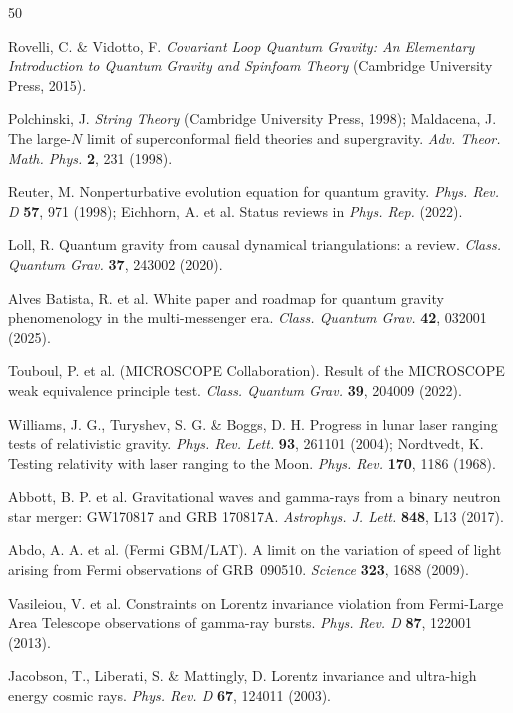 \documentclass[11pt,a4paper]{article}
\begin{document}
\begin{thebibliography}{50}\small

 Rovelli, C. \& Vidotto, F. \emph{Covariant Loop Quantum Gravity: An
Elementary Introduction to Quantum Gravity and Spinfoam Theory} (Cambridge University Press,
2015).

 Polchinski, J. \emph{String Theory} (Cambridge University Press, 1998);
Maldacena, J. The large-$N$ limit of superconformal field theories and supergravity.
\emph{Adv. Theor. Math. Phys.} \textbf{2}, 231 (1998).

 Reuter, M. Nonperturbative evolution equation for quantum gravity.
\emph{Phys. Rev. D} \textbf{57}, 971 (1998); Eichhorn, A. et al. Status reviews in
\emph{Phys. Rep.} (2022).

 Loll, R. Quantum gravity from causal dynamical triangulations: a review.
\emph{Class. Quantum Grav.} \textbf{37}, 243002 (2020).

 Alves Batista, R. et al. White paper and roadmap for quantum gravity
phenomenology in the multi-messenger era. \emph{Class. Quantum Grav.} \textbf{42}, 032001 (2025).

 Touboul, P. et al. (MICROSCOPE Collaboration). Result of the MICROSCOPE
weak equivalence principle test. \emph{Class. Quantum Grav.} \textbf{39}, 204009 (2022).

 Williams, J. G., Turyshev, S. G. \& Boggs, D. H. Progress in lunar laser
ranging tests of relativistic gravity. \emph{Phys. Rev. Lett.} \textbf{93}, 261101 (2004);
Nordtvedt, K. Testing relativity with laser ranging to the Moon. \emph{Phys. Rev.}
\textbf{170}, 1186 (1968).

 Abbott, B. P. et al. Gravitational waves and gamma-rays from a binary neutron
star merger: GW170817 and GRB 170817A. \emph{Astrophys. J. Lett.} \textbf{848}, L13 (2017).

 Abdo, A. A. et al. (Fermi GBM/LAT). A limit on the variation of speed of
light arising from Fermi observations of GRB~090510. \emph{Science} \textbf{323}, 1688 (2009).

 Vasileiou, V. et al. Constraints on Lorentz invariance violation from
Fermi-Large Area Telescope observations of gamma-ray bursts. \emph{Phys. Rev. D} \textbf{87},
122001 (2013).

 Jacobson, T., Liberati, S. \& Mattingly, D. Lorentz invariance and
ultra-high energy cosmic rays. \emph{Phys. Rev. D} \textbf{67}, 124011 (2003).


\end{thebibliography}
\end{document}
